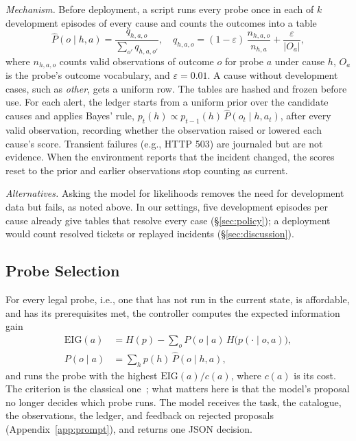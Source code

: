 \emph{Mechanism.} Before deployment, a script runs every probe once in each of $k$ development episodes of every cause and counts the outcomes into a table
\[\widehat P(o \mid h, a) = \frac{q_{h,a,o}}{\sum_{o'} q_{h,a,o'}},\quad q_{h,a,o} = (1-\varepsilon)\,\frac{n_{h,a,o}}{n_{h,a}} + \frac{\varepsilon}{|O_a|},\]
where $n_{h,a,o}$ counts valid observations of outcome $o$ for probe $a$ under cause $h$, $O_a$ is the probe's outcome vocabulary, and $\varepsilon = 0.01$. A cause without development cases, such as \textit{other}, gets a uniform row. The tables are hashed and frozen before use. For each alert, the ledger starts from a uniform prior over the candidate causes and applies Bayes' rule, $p_t(h) \propto p_{t-1}(h)\,\widehat P(o_t \mid h, a_t)$, after every valid observation, recording whether the observation raised or lowered each cause's score. Transient failures (e.g., HTTP 503) are journaled but are not evidence. When the environment reports that the incident changed, the scores reset to the prior and earlier observations stop counting as current.

\emph{Alternatives.} Asking the model for likelihoods removes the need for development data but fails, as noted above. In our settings, five development episodes per cause already give tables that resolve every case (\S\ref{sec:policy}); a deployment would count resolved tickets or replayed incidents (\S\ref{sec:discussion}).

\subsection{Probe Selection}
\label{sec:selection}
For every legal probe, i.e., one that has not run in the current state, is affordable, and has its prerequisites met, the controller computes the expected information gain
\begin{align*}
\mathrm{EIG}(a) &= H(p) - \textstyle\sum_{o} P(o \mid a)\, H\big(p(\cdot \mid o, a)\big),\\
P(o \mid a) &= \textstyle\sum_h p(h)\, \widehat P(o \mid h, a),
\end{align*}
and runs the probe with the highest $\mathrm{EIG}(a)/c(a)$, where $c(a)$ is its cost. The criterion is the classical one~\citep{dekleer1987,golovin2010}; what matters here is that the model's proposal no longer decides which probe runs. The model receives the task, the catalogue, the observations, the ledger, and feedback on rejected proposals (Appendix~\ref{app:prompt}), and returns one JSON decision.

